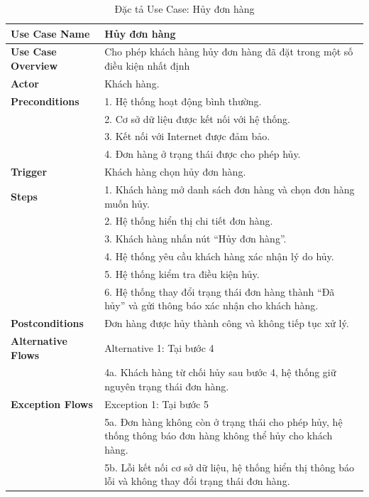 {\begin{longtable}{|>{\bfseries}p{4cm}|p{11.5cm}|}
\caption{Đặc tả Use Case: Hủy đơn hàng}
\label{tab:uc-cancel-order} \\
\hline
\textbf{Use Case Name} & Hủy đơn hàng \\
\hline
\textbf{Use Case Overview} & Cho phép khách hàng hủy đơn hàng đã đặt trong một số điều kiện nhất định \\
\hline
\textbf{Actor} & Khách hàng. \\
\hline
\textbf{Preconditions} & 1. Hệ thống hoạt động bình thường. \\
& 2. Cơ sở dữ liệu được kết nối với hệ thống. \\
& 3. Kết nối với Internet được đảm bảo. \\
& 4. Đơn hàng ở trạng thái được cho phép hủy. \\
\hline
\textbf{Trigger} & Khách hàng chọn hủy đơn hàng. \\
\hline
\textbf{Steps} & 1. Khách hàng mở danh sách đơn hàng và chọn đơn hàng muốn hủy. \\
& 2. Hệ thống hiển thị chi tiết đơn hàng. \\
& 3. Khách hàng nhấn nút “Hủy đơn hàng”. \\
& 4. Hệ thống yêu cầu khách hàng xác nhận lý do hủy. \\
& 5. Hệ thống kiểm tra điều kiện hủy. \\
& 6. Hệ thống thay đổi trạng thái đơn hàng thành “Đã hủy” và gửi thông báo xác nhận cho khách hàng. \\
\hline
\textbf{Postconditions} & Đơn hàng được hủy thành công và không tiếp tục xử lý. \\
\hline
\textbf{Alternative Flows} & Alternative 1: Tại bước 4 \\
& 4a. Khách hàng từ chối hủy sau bước 4, hệ thống giữ nguyên trạng thái đơn hàng. \\
\hline
\textbf{Exception Flows} & Exception 1: Tại bước 5 \\
& 5a. Đơn hàng không còn ở trạng thái cho phép hủy, hệ thống thông báo đơn hàng không thể hủy cho khách hàng. \\
& 5b. Lỗi kết nối cơ sở dữ liệu, hệ thống hiển thị thông báo lỗi và không thay đổi trạng thái đơn hàng. \\
\hline
\end{longtable}

}

